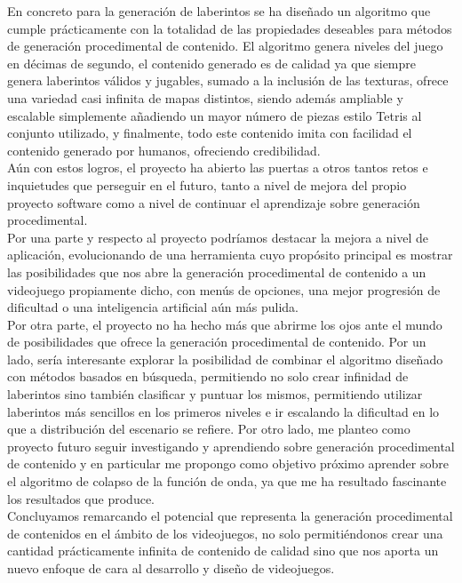 En concreto para la generación de laberintos se ha diseñado un algoritmo que cumple prácticamente con la totalidad de las propiedades deseables para métodos de generación procedimental de contenido. El algoritmo genera niveles del juego en décimas de segundo, el contenido generado es de calidad ya que siempre genera laberintos válidos y jugables, sumado a la inclusión de las texturas, ofrece una variedad casi infinita de mapas distintos, siendo además ampliable y escalable simplemente añadiendo un mayor número de piezas estilo Tetris al conjunto utilizado, y finalmente, todo este contenido imita con facilidad el contenido generado por humanos, ofreciendo credibilidad.\\

Aún con estos logros, el proyecto ha abierto las puertas a otros tantos retos e inquietudes que perseguir en el futuro, tanto a nivel de mejora del propio proyecto software como a nivel de continuar el aprendizaje sobre generación procedimental.\\ 

Por una parte y respecto al proyecto podríamos destacar la mejora a nivel de aplicación, evolucionando de una herramienta cuyo propósito principal es mostrar las posibilidades que nos abre la generación procedimental de contenido a un videojuego propiamente dicho, con menús de opciones, una mejor progresión de dificultad o una inteligencia artificial aún más pulida.\\

Por otra parte, el proyecto no ha hecho más que abrirme los ojos ante el mundo de posibilidades que ofrece la generación procedimental de contenido. Por un lado, sería interesante explorar la posibilidad de combinar el algoritmo diseñado con métodos basados en búsqueda, permitiendo no solo crear infinidad de laberintos sino también clasificar y puntuar los mismos, permitiendo utilizar laberintos más sencillos en los primeros niveles e ir escalando la dificultad en lo que a distribución del escenario se refiere. Por otro lado, me planteo como proyecto futuro seguir investigando y aprendiendo sobre generación procedimental de contenido y en particular me propongo como objetivo próximo aprender sobre el algoritmo de colapso de la función de onda, ya que me ha resultado fascinante los resultados que produce.\\

Concluyamos remarcando el potencial que representa la generación procedimental de contenidos en el ámbito de los videojuegos, no solo permitiéndonos crear una cantidad prácticamente infinita de contenido de calidad sino que nos aporta un nuevo enfoque de cara al desarrollo y diseño de videojuegos.